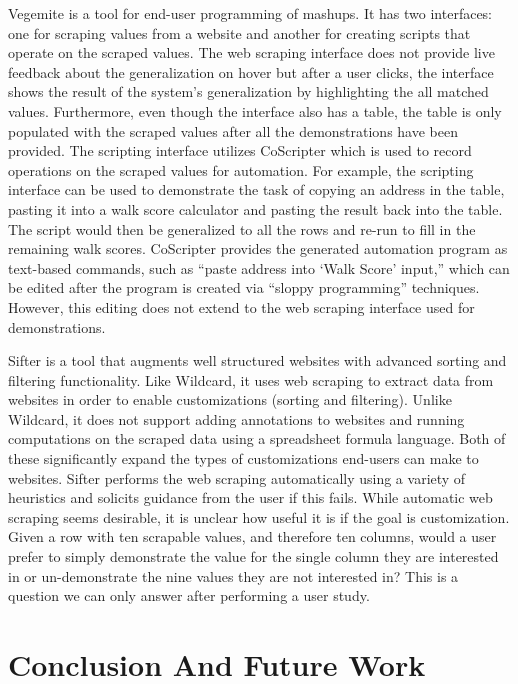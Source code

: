 \documentclass[sigconf,10pt]{acmart}
\begin{document}
Vegemite \citep{lin2009} is a tool for end-user programming of mashups.
It has two interfaces: one for scraping values from a website and
another for creating scripts that operate on the scraped values. The web
scraping interface does not provide live feedback about the
generalization on hover but after a user clicks, the interface shows the
result of the system's generalization by highlighting the all matched
values. Furthermore, even though the interface also has a table, the
table is only populated with the scraped values after all the
demonstrations have been provided. The scripting interface utilizes
CoScripter \citep{leshed2008} which is used to record operations on the
scraped values for automation. For example, the scripting interface can
be used to demonstrate the task of copying an address in the table,
pasting it into a walk score calculator and pasting the result back into
the table. The script would then be generalized to all the rows and
re-run to fill in the remaining walk scores. CoScripter provides the
generated automation program as text-based commands, such as ``paste
address into `Walk Score' input,'' which can be edited after the program
is created via ``sloppy programming'' \citep{lin2009} techniques.
However, this editing does not extend to the web scraping interface used
for demonstrations.

Sifter \citep{huynh2006} is a tool that augments well structured
websites with advanced sorting and filtering functionality. Like
Wildcard, it uses web scraping to extract data from websites in order to
enable customizations (sorting and filtering). Unlike Wildcard, it does
not support adding annotations to websites and running computations on
the scraped data using a spreadsheet formula language. Both of these
significantly expand the types of customizations end-users can make to
websites. Sifter performs the web scraping automatically using a variety
of heuristics and solicits guidance from the user if this fails. While
automatic web scraping seems desirable, it is unclear how useful it is
if the goal is customization. Given a row with ten scrapable values, and
therefore ten columns, would a user prefer to simply demonstrate the
value for the single column they are interested in or un-demonstrate the
nine values they are not interested in? This is a question we can only
answer after performing a user study.

\hypertarget{sec:conclusion}{%
\section{Conclusion And Future Work}\label{sec:conclusion}}
\end{document}
